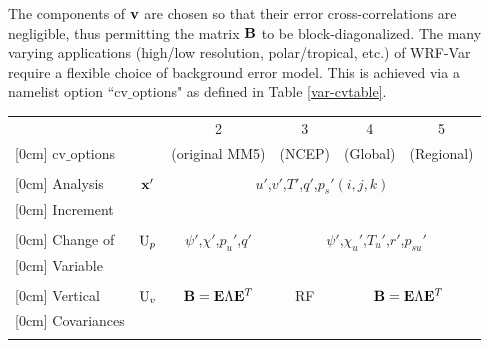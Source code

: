 The components of ${\bf v}$ are chosen so that their error cross-correlations are negligible, 
thus permitting the matrix ${\bf B}$ to be block-diagonalized. The many varying applications 
(high/low resolution, polar/tropical, etc.) of WRF-Var require a flexible 
choice of background error model. This is achieved via a namelist option 
``cv$\_$options" as defined in Table \ref{var-cvtable}.

\begin{table}[h]
\begin{center}
\begin{tabular}{|l|l|l|l|l|l|}
\hline
 { } &
 \ &
 \multicolumn{1}{c|}{2} &
 \multicolumn{1}{c|}{3} & 
 \multicolumn{1}{c|}{4} &
 \multicolumn{1}{c|}{5} \\
 \raisebox{1.5ex}[0cm] {cv$\_$options} & 
 \ &
 \multicolumn{1}{c|}{(original MM5)} &
 \multicolumn{1}{c|}{(NCEP)} &
 \multicolumn{1}{c|}{(Global)} &
 \multicolumn{1}{c|}{(Regional)}\\
 \hline
 { } &
 \multicolumn{1}{c|}{ } &
 \multicolumn{4}{c|}{ }\\
 \raisebox{1.5ex}[0cm] {Analysis} & 
 \multicolumn{1}{c|}{${\bf x}'$} &
 \multicolumn{4}{c|}{$u'$,$v'$,$T'$,$q'$,${p_s}'(i,j,k)$}\\
 \raisebox{1.5ex}[0cm] {Increment} & 
 \multicolumn{1}{c|}{ } &
 \multicolumn{4}{c|}{ }\\
 \hline
 { } &
 \multicolumn{1}{c|}{ } &
 \multicolumn{1}{c|}{ } &
 \multicolumn{3}{c|}{ }\\
 \raisebox{1.5ex}[0cm] {Change of} & 
 \multicolumn{1}{c|}{${\rm U}_p$} &
 \multicolumn{1}{c|}{$\psi'$,$\chi'$,$p_u'$,$q'$} &
 \multicolumn{3}{c|}{$\psi'$,$\chi_u'$,$T_u'$,$r'$,$p_{su}'$}\\
 \raisebox{1.5ex}[0cm] {Variable} & 
 \multicolumn{1}{c|}{ } &
 \multicolumn{1}{c|}{ } &
 \multicolumn{3}{c|}{ }\\
 \hline
 { } &
 \multicolumn{1}{c|}{ } &
 \multicolumn{1}{c|}{ } &
 \multicolumn{1}{c|}{ } &
 \multicolumn{2}{c|}{ }\\
 \raisebox{1.5ex}[0cm] {Vertical} &
 \multicolumn{1}{c|}{${\rm U}_v$} &
 \multicolumn{1}{c|}{${\bf B}={\bf E}{\Lambda}{\bf E}^{T}$} &
 \multicolumn{1}{c|}{RF} &
 \multicolumn{2}{c|}{${\bf B}={\bf E}{\Lambda}{\bf E}^{T}$} \\
 \raisebox{1.5ex}[0cm] {Covariances} &
 \multicolumn{1}{c|}{ } &
 \multicolumn{1}{c|}{ } &
 \multicolumn{1}{c|}{ } &
 \multicolumn{2}{c|}{ }\\
 \hline
 { } &

\end{tabular}
\end{center}
\end{table}
